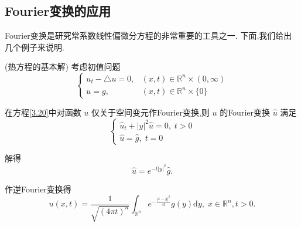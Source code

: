 \documentclass[lang=cn,newtx,10pt,scheme=chinese,thmcnt=chapter]{elegantbook}
\newcommand{\dif}{\mathrm{d}}
\begin{document}
\subsection{Fourier变换的应用}

Fourier变换是研究常系数线性偏微分方程的非常重要的工具之一. 下面,我们给出几个例子来说明.
 \begin{example}
  (热方程的基本解) 考虑初值问题
  \begin{equation}
  \left\{  \begin{matrix} {u}_{t} - \bigtriangleup u = 0, & \left( {x,t}\right)  \in  {\mathbb{R}}^{n} \times  \left( {0,\infty }\right) \\  u = g, & \left( {x,t}\right)  \in  {\mathbb{R}}^{n} \times  \{ 0\}  \end{matrix}\right.  \label{3.20}
  \end{equation}
\end{example}\begin{solution}
  在方程\ref{3.20}中对函数 \(u\) 仅关于空间变元作Fourier变换,则 \(u\) 的Fourier变换 \(\widehat{u}\) 满足
\begin{equation}
\left\{  \begin{array}{r} {\widehat{u}}_{t} + {\left| y\right| }^{2}\widehat{u} = 0,\;t > 0 \\  \widehat{u} = \widehat{g},\;t = 0 \end{array}\right.  \label{3.21}
\end{equation}

解得
\begin{equation*}
\widehat{u} = {e}^{-t{\left| y\right| }^{2}}\widehat{g}.
\end{equation*}

作逆Fourier变换得
\begin{equation*}
u\left( {x,t}\right)  = \frac{1}{\sqrt{{\left( 4\pi t\right) }^{n}}}{\int }_{{\mathbb{R}}^{n}}{e}^{-\frac{{\left| x - y\right| }^{2}}{4t}}g\left( y\right) {\dif y},\;x \in  {\mathbb{R}}^{n},t > 0.
\end{equation*}
\end{solution}
\end{document}
